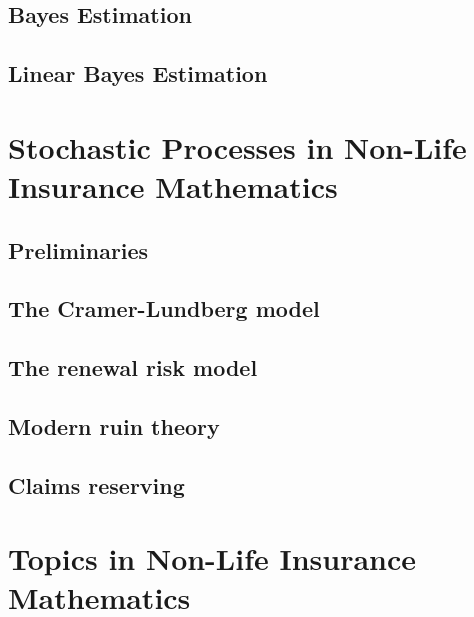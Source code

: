 \documentclass[a4paper,12pt,openany]{book}
\begin{document}
\hypertarget{bayes-estimation}{%
\section{Bayes Estimation}\label{bayes-estimation}}

\hypertarget{linear-bayes-estimation}{%
\section{Linear Bayes Estimation}\label{linear-bayes-estimation}}

\hypertarget{stochastic-processes-in-non-life-insurance-mathematics}{%
\chapter{Stochastic Processes in Non-Life Insurance Mathematics}\label{stochastic-processes-in-non-life-insurance-mathematics}}

\hypertarget{preliminaries}{%
\section{Preliminaries}\label{preliminaries}}

\hypertarget{the-cramer-lundberg-model}{%
\section{The Cramer-Lundberg model}\label{the-cramer-lundberg-model}}

\hypertarget{the-renewal-risk-model}{%
\section{The renewal risk model}\label{the-renewal-risk-model}}

\hypertarget{modern-ruin-theory}{%
\section{Modern ruin theory}\label{modern-ruin-theory}}

\hypertarget{claims-reserving}{%
\section{Claims reserving}\label{claims-reserving}}

\hypertarget{topics-in-non-life-insurance-mathematics}{%
\chapter{Topics in Non-Life Insurance Mathematics}\label{topics-in-non-life-insurance-mathematics}}
\end{document}
